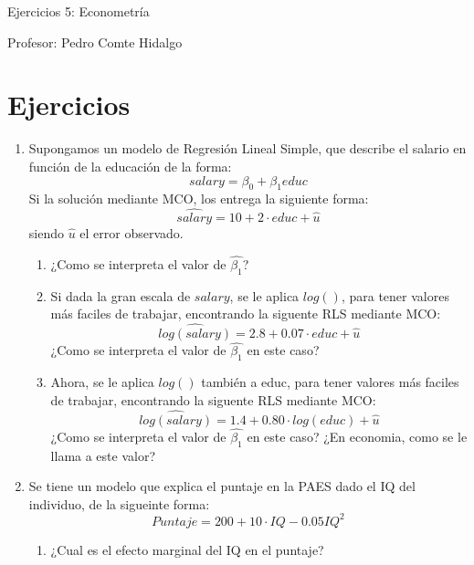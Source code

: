 \documentclass[10pt,a4paper]{article}
\begin{document}
\vspace{5cm}

\begin{center}
    {\Large  Ejercicios 5: Econometría }

Profesor:    Pedro Comte Hidalgo
\end{center}



\section{Ejercicios}
\begin{enumerate}
    \item Supongamos un modelo de Regresión Lineal Simple, que describe el salario en función de la educación de la forma:
    $$salary = \beta_0 + \beta_1 educ$$
    Si la solución mediante MCO, los entrega la siguiente forma:
        $$\hat{salary} = 10 + 2\cdot educ + \hat{u}$$
    siendo $\hat{u}$ el error observado.
    \begin{enumerate}
        \item  ¿Como se interpreta el valor de $\hat{\beta_1}$?  \\
        

        \item Si dada la gran escala de $salary$, se le aplica $log()$, para tener valores más faciles de trabajar, encontrando la siguente RLS mediante MCO:
        $$\hat{log({salary})} = 2.8 + 0.07\cdot educ + \hat{u}$$
        ¿Como se interpreta el valor de $\hat{\beta_1}$ en este caso?  \\
        
        \item Ahora, se le aplica $log()$ también a educ, para tener valores más faciles de trabajar, encontrando la siguente RLS mediante MCO:
        $$\hat{log({salary})} = 1.4 + 0.80\cdot log(educ) + \hat{u}$$
        ¿Como se interpreta el valor de $\hat{\beta_1}$ en este caso? ¿En economia, como se le llama a este valor?\\
        
    \end{enumerate}


\item Se tiene un modelo que explica el puntaje en la PAES dado el IQ del individuo, de la sigueinte forma:
$$Puntaje = 200 + 10 \cdot IQ -  0.05IQ^2$$
\begin{enumerate}
    \item ¿Cual es el efecto marginal del IQ en el puntaje?
    

\end{enumerate}
\end{enumerate}
\end{document}
